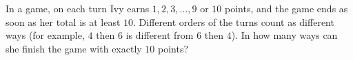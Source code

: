In a game, on each turn Ivy earns $1,2,3,\dots,9$ or $10$ points, and the game ends as soon as her total is at least $10$. Different orders of the turns count as different ways (for example, $4$ then $6$ is different from $6$ then $4$). In how many ways can she finish the game with exactly $10$ points?
